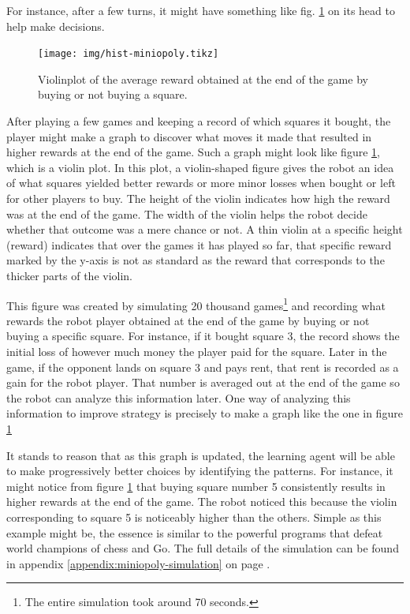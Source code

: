 For instance, after a few turns, it might have something like fig.
\ref{fig:violinplot} on its head to help make decisions.

\begin{figure}
\centering
\texttt{[image: img/hist-miniopoly.tikz]}
\caption{Violinplot of the average reward obtained at the end 
of the game by buying or not buying a square.}
\label{fig:violinplot}
\end{figure}

After playing a few games and keeping a record of which squares it bought, the
player might make a graph to discover what moves it made that resulted in higher
rewards at the end of the game. Such a graph might look like figure
\ref{fig:violinplot}, which is a violin plot. In this plot, a violin-shaped
figure gives the robot an idea of what squares yielded better rewards or more
minor losses when bought or left for other players to buy. The height of the
violin indicates how high the reward was at the end of the game. The width of
the violin helps the robot decide whether that outcome was a mere chance or not.
A thin violin at a specific height (reward) indicates that over the games it has
played so far, that specific reward marked by the y-axis is not as standard as
the reward that corresponds to the thicker parts of the violin.

This figure was created by simulating 20 thousand games\footnote{The entire
simulation took around 70 seconds.} and recording what rewards the robot player
obtained at the end of the game by buying or not buying a specific square. For
instance, if it bought square 3, the record shows the initial loss of however
much money the player paid for the square. Later in the game, if the opponent
lands on square 3 and pays rent, that rent is recorded as a gain for the robot
player. That number is averaged out at the end of the game so the robot can
analyze this information later. One way of analyzing this information to improve
strategy is precisely to make a graph like the one in figure
\ref{fig:violinplot}

It stands to reason that as this graph is updated, the learning agent will be
able to make progressively better choices by identifying the patterns. For
instance, it might notice from figure \ref{fig:violinplot} that buying square
number 5 consistently results in higher rewards at the end of the game. The
robot noticed this because the violin corresponding to square 5 is noticeably
higher than the others. Simple as this example might be, the essence is similar
to the powerful programs that defeat world champions of chess and Go. The full
details of the simulation can be found in appendix
\ref{appendix:miniopoly-simulation} on page
\pageref{appendix:miniopoly-simulation}.

